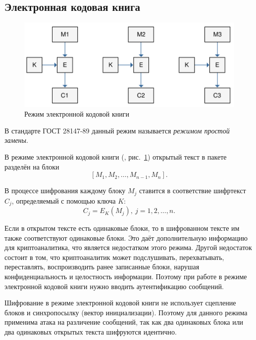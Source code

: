 \subsection{Электронная кодовая книга}

\begin{figure}[bt]
	\centering
	\includegraphics[width=1\textwidth]{pic/ECB}
	\caption{Режим электронной кодовой книги}
	\label{fig:ECB}
\end{figure}

В стандарте ГОСТ 28147-89 данный режим называется \emph{режимом простой замены}.~\cite{GOST-89}

В режиме электронной кодовой книги (, рис.~\ref{fig:ECB}) открытый текст в пакете разделён на блоки
    \[ \left[ M_1, M_2, \dots, M_{n-1}, M_n \right]. \]

В процессе шифрования каждому блоку $M_j$ ставится в соответствие шифртекст $C_j$, определяемый с помощью ключа $K$:
    \[ C_j = E_K(M_j), ~ j = 1, 2, \dots, n. \]

Если в открытом тексте есть одинаковые блоки, то в шифрованном тексте им также соответствуют одинаковые блоки. Это даёт дополнительную информацию для криптоаналитика, что является недостатком этого режима. Другой недостаток состоит в том, что криптоаналитик может подслушивать, перехватывать, переставлять, воспроизводить ранее записанные блоки, нарушая конфиденциальность и целостность информации. Поэтому при работе в режиме электронной кодовой книги нужно вводить аутентификацию сообщений.

Шифрование в режиме электронной кодовой книги не использует сцепление блоков и синхропосылку (вектор инициализации). Поэтому для данного режима применима атака на различение сообщений, так как два одинаковых блока или два одинаковых открытых текста шифруются идентично.

